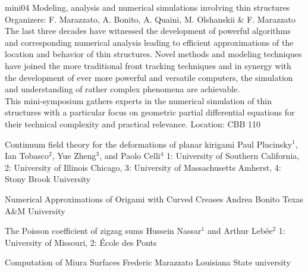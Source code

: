 \mini
{mini04}
{Modeling, analysis and numerical simulations involving thin structures}
{Organizers: F. Marazzato, A. Bonito, A. Quaini, M. Olshanskii \& F. Marazzato}
{The last three decades have witnessed the development of powerful algorithms and corresponding numerical analysis leading to efficient approximations of the location and behavior of thin structures. Novel methods and modeling techniques have joined the more traditional front tracking techniques and in synergy with the development of ever more powerful and versatile computers, the simulation and understanding of rather complex phenomena are achievable.\\
This mini-symposium gathers experts in the numerical simulation of thin structures with a particular focus on geometric partial differential equations for their technical complexity and practical relevance.}
{Location: CBB 110}

\begin{talks}
\item\talk
{Continuum field theory for the deformations of planar kirigami}
{Paul Plucinsky$^1$, Ian Tobasco$^2$, Yue Zheng$^3$, and Paolo Celli$^4$}
{1: University of Southern California, 2: University of Illinois Chicago, 3: University of Massachusetts Amherst, 4: Stony Brook University}
\item\talk
{Numerical Approximations of Origami with Curved Creases}
{Andrea Bonito}
{Texas A\&M University}
\item\talk
{The Poisson coefficient of zigzag sums}
{Hussein Nassar$^{1}$ and Arthur Leb\'ee$^{2}$}
{1: University of Missouri, 2: \'Ecole des Ponts}
\item\talk
{Computation of Miura Surfaces}
{Frederic Marazzato}
{Louisiana State university}
\end{talks}
\room

